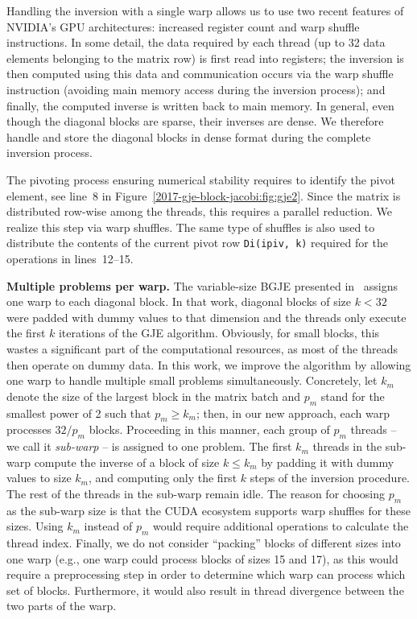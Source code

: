 Handling the inversion with a single warp allows us to
use two recent features of NVIDIA's GPU architectures:
increased register count and warp shuffle instructions.
In some detail, the data required by each thread
(up to 32 data elements belonging to the matrix row)
is first read into registers;
the inversion is then computed using this data and communication occurs via the warp shuffle instruction
(avoiding main memory access during the inversion process);
and finally, the computed inverse is written back to main memory.
In general, even though the diagonal blocks are sparse,
their inverses are dense.
We therefore handle and store the diagonal blocks in dense format during the complete inversion process.

The pivoting process ensuring numerical stability requires to identify the pivot element, 
see line~8 in Figure~\ref{2017-gje-block-jacobi:fig:gje2}. 
Since the matrix is distributed row-wise among the threads,
this requires a parallel reduction.
We realize this step via warp shuffles.
The same type of shuffles is also used to distribute the contents
of the current pivot row \texttt{Di(ipiv, k)}
required for the operations in lines~12--15.

\vspace*{1ex}
\noindent
\textbf{Multiple problems per warp.}
The variable-size BGJE presented in~\cite{Anzt:2017:BGE:3026937.3026940}
assigns one warp to each diagonal block. 
{In that work, diagonal} blocks of size $k<32$ were padded with dummy values to that dimension and the
threads only execute the first $k$ iterations of the GJE algorithm.
Obviously, for small blocks, 
this wastes a significant part of the computational resources,
as most of the threads then operate on dummy data.
{In this work, we} improve the algorithm by 
allowing one warp to handle multiple small problems simultaneously.
Concretely, {let $k_m$ denote the size of the largest block in the matrix batch
and $p_m$ stand for the smallest power of 2 such that $p_m \geq k_m$;
then, in our new approach, each warp processes $32 / p_m$ blocks.
Proceeding in this manner,} each group of $p_m$ threads -- we call it {\it sub-warp} -- 
is assigned to one problem.
The first $k_m$ threads in the sub-warp compute the inverse of a block
of size $k \leq k_m$ by padding it with dummy values to size $k_m$,
and computing {only} the first $k$ steps of the inversion procedure.
The rest of the threads in the sub-warp remain idle.
The reason for choosing $p_m$
as the sub-warp size is
that the CUDA ecosystem supports warp shuffles for these sizes.
Using $k_m$ instead of $p_m$ would require additional operations 
to calculate the thread index.
Finally, we do not consider ``packing'' blocks of different sizes into one warp
(e.g.,
one warp could process blocks of sizes 15 and 17),
as this {would require} a preprocessing step in order to determine
which warp can process which set of blocks. {Furthermore, 
it would} also result in thread divergence between the two parts of the warp.

